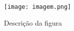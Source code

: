 
\begin{figure}[htbp]
    \centering
    \texttt{[image: imagem.png]}
    \caption{Descrição da figura}
    \label{fig:exemplo}
\end{figure}



